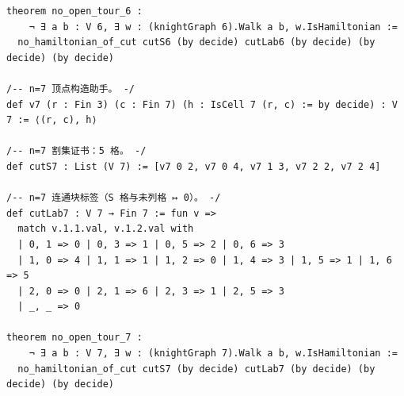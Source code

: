 \documentclass[11pt]{article}
\begin{document}
\begin{lstlisting}
theorem no_open_tour_6 :
    ¬ ∃ a b : V 6, ∃ w : (knightGraph 6).Walk a b, w.IsHamiltonian :=
  no_hamiltonian_of_cut cutS6 (by decide) cutLab6 (by decide) (by decide) (by decide)

/-- n=7 顶点构造助手。 -/
def v7 (r : Fin 3) (c : Fin 7) (h : IsCell 7 (r, c) := by decide) : V 7 := ⟨(r, c), h⟩

/-- n=7 割集证书：5 格。 -/
def cutS7 : List (V 7) := [v7 0 2, v7 0 4, v7 1 3, v7 2 2, v7 2 4]

/-- n=7 连通块标签（S 格与未列格 ↦ 0）。 -/
def cutLab7 : V 7 → Fin 7 := fun v =>
  match v.1.1.val, v.1.2.val with
  | 0, 1 => 0 | 0, 3 => 1 | 0, 5 => 2 | 0, 6 => 3
  | 1, 0 => 4 | 1, 1 => 1 | 1, 2 => 0 | 1, 4 => 3 | 1, 5 => 1 | 1, 6 => 5
  | 2, 0 => 0 | 2, 1 => 6 | 2, 3 => 1 | 2, 5 => 3
  | _, _ => 0

theorem no_open_tour_7 :
    ¬ ∃ a b : V 7, ∃ w : (knightGraph 7).Walk a b, w.IsHamiltonian :=
  no_hamiltonian_of_cut cutS7 (by decide) cutLab7 (by decide) (by decide) (by decide)
\end{lstlisting}
\end{document}
